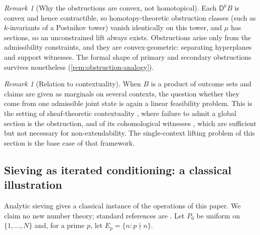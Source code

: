 \documentclass[11pt]{article}
\theoremstyle{definition}
\theoremstyle{remark}
\newtheorem{remark}[theorem]{Remark}
\newcommand{\D}{\mathsf{D}}
\begin{document}
\begin{remark}[Why the obstructions are convex, not homotopical]
Each $\D^kB$ is convex and hence contractible, so homotopy-theoretic obstruction classes (such as
$k$-invariants of a Postnikov tower) vanish identically on this tower, and $\mu$ has sections, so an
unconstrained lift always exists. Obstructions arise only from the admissibility constraints, and they
are convex-geometric: separating hyperplanes and support witnesses. The formal shape of primary and
secondary obstructions survives nonetheless (\cref{rem:obstruction-analogy}).
\end{remark}

\begin{remark}[Relation to contextuality]
When $B$ is a product of outcome sets and claims are given as marginals on several contexts, the
question whether they come from one admissible joint state is again a linear feasibility problem.
This is the setting of sheaf-theoretic contextuality \cite{AbramskyBrandenburger2011}, where failure to
admit a global section is the obstruction, and of its cohomological witnesses
\cite{AbramskyMansfieldBarbosa2012}, which are sufficient but not necessary for non-extendability. The
single-context lifting problem of this section is the base case of that framework.
\end{remark}

\subsection{Sieving as iterated conditioning: a classical illustration}\label{sec:sieve}

Analytic sieving gives a classical instance of the operations of this paper. We claim no new number
theory; standard references are \cite{FriedlanderIwaniec2010,Tenenbaum2015}. Let $P_0$ be uniform on
$\{1,\dots,N\}$ and, for a prime $p$, let $E_p=\{n:p\nmid n\}$.
\end{document}
